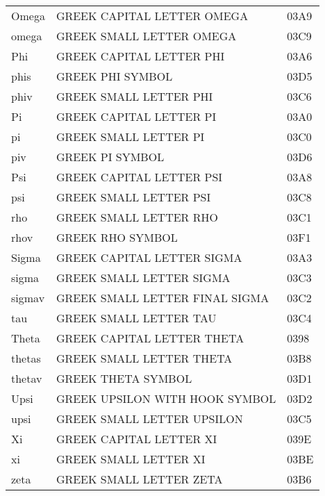 \documentclass{article}
\begin{document}
\begin{supertabular}{lll}
Omega              & GREEK CAPITAL LETTER OMEGA          & 03A9\\
omega              & GREEK SMALL LETTER OMEGA            & 03C9\\
Phi                & GREEK CAPITAL LETTER PHI            & 03A6\\
phis               & GREEK PHI SYMBOL                    & 03D5\\
phiv               & GREEK SMALL LETTER PHI              & 03C6\\
Pi                 & GREEK CAPITAL LETTER PI             & 03A0\\
pi                 & GREEK SMALL LETTER PI               & 03C0\\
piv                & GREEK PI SYMBOL                     & 03D6\\
Psi                & GREEK CAPITAL LETTER PSI            & 03A8\\
psi                & GREEK SMALL LETTER PSI              & 03C8\\
rho                & GREEK SMALL LETTER RHO              & 03C1\\
rhov               & GREEK RHO SYMBOL                    & 03F1\\
Sigma              & GREEK CAPITAL LETTER SIGMA          & 03A3\\
sigma              & GREEK SMALL LETTER SIGMA            & 03C3\\
sigmav             & GREEK SMALL LETTER FINAL SIGMA      & 03C2\\
tau                & GREEK SMALL LETTER TAU              & 03C4\\
Theta              & GREEK CAPITAL LETTER THETA          & 0398\\
thetas             & GREEK SMALL LETTER THETA            & 03B8\\
thetav             & GREEK THETA SYMBOL                  & 03D1\\
Upsi               & GREEK UPSILON WITH HOOK SYMBOL      & 03D2\\
upsi               & GREEK SMALL LETTER UPSILON          & 03C5\\
Xi                 & GREEK CAPITAL LETTER XI             & 039E\\
xi                 & GREEK SMALL LETTER XI               & 03BE\\
zeta               & GREEK SMALL LETTER ZETA             & 03B6\\
\end{supertabular}
\end{document}
